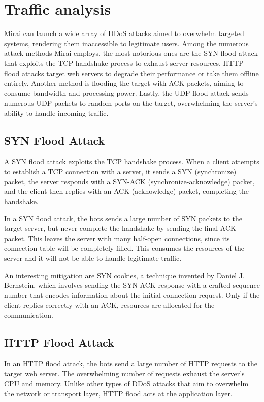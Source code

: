 \chapter{Traffic analysis}

Mirai can launch a wide array of DDoS attacks aimed to overwhelm targeted systems, rendering them inaccessible to legitimate users. Among the numerous attack methods Mirai employs, the most notorious ones are the SYN flood attack that exploits the TCP handshake process to exhaust server resources. HTTP flood attacks target web servers to degrade their performance or take them offline entirely. Another method is flooding the target with ACK packets, aiming to consume bandwidth and processing power. Lastly, the UDP flood attack sends numerous UDP packets to random ports on the target, overwhelming the server's ability to handle incoming traffic.

\section{SYN Flood Attack}

A SYN flood attack exploits the TCP handshake process. When a client attempts to establish a TCP connection with a server, it sends a SYN (synchronize) packet, the server responds with a SYN-ACK (synchronize-acknowledge) packet, and the client then replies with an ACK (acknowledge) packet, completing the handshake. 

In a SYN flood attack, the bots sends a large number of SYN packets to the target server, but never complete the handshake by sending the final ACK packet. This leaves the server with many half-open connections, since its connection table will be completely filled. This consumes the resources of the server and it will not be able to handle legitimate traffic.

An interesting mitigation are SYN cookies, a technique invented by Daniel J. Bernstein, which involves sending the SYN-ACK response with a crafted sequence number that encodes information about the initial connection request. Only if the client replies correctly with an ACK, resources are allocated for the communication.

\section{HTTP Flood Attack}

In an HTTP flood attack, the bots send a large number of HTTP requests to the target web server. The overwhelming number of requests exhaust the server's CPU and memory. Unlike other types of DDoS attacks that aim to overwhelm the network or transport layer, HTTP flood acts at the application layer.

